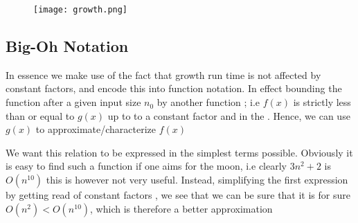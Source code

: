 

	\begin{figure}[H]
		\begin{center}
		\texttt{[image: growth.png]}
		\end{center}
	\end{figure}

\subsection{Big-Oh Notation}




		\par{In essence we make use of the fact that growth run time is not affected by
				constant factors, and encode this into function notation. In effect
				bounding the function after a given input size $n_0$ by another
		function ; i.e $f(x)$ is strictly less than or equal to $g(x)$ up to to a
		constant factor and in the . Hence, we can use $g(x)$ to
		approximate/characterize $f(x)$}

		\par{We want this relation to be expressed in the simplest terms possible. Obviously it is easy to find such a function if one aims for the moon, i.e
				clearly $3n^2 + 2$ is $O(n^{10})$ this is however not very useful.
				Instead, simplifying the first expression by getting read of constant
				factors , we see that we can be sure that it is for sure $O(n^2) < O(n^{10})$,
		which is therefore a better approximation}




